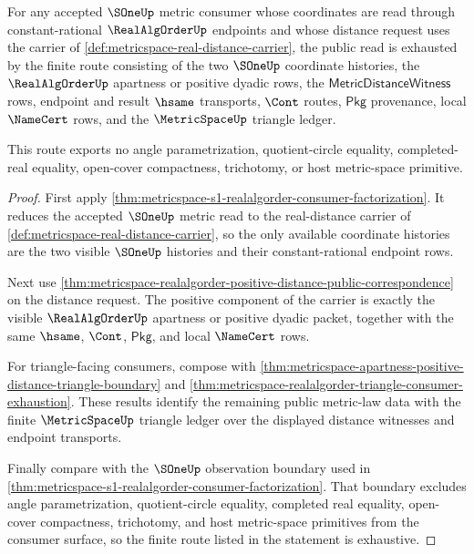 \begin{theorem}
\label{thm:metricspace-realalgorder-sone-distance-route-exhaustion}
For any accepted $\SOneUp$ metric consumer whose coordinates are read through
constant-rational $\RealAlgOrderUp$ endpoints and whose distance request uses
the carrier of \autoref{def:metricspace-real-distance-carrier}, the public
read is exhausted by the finite route consisting of the two $\SOneUp$
coordinate histories, the $\RealAlgOrderUp$ apartness or positive dyadic rows,
the $\mathsf{MetricDistanceWitness}$ rows, endpoint and result $\hsame$
transports, $\Cont$ routes, $\mathsf{Pkg}$ provenance, local $\NameCert$ rows,
and the $\MetricSpaceUp$ triangle ledger.

This route exports no angle parametrization, quotient-circle equality,
completed-real equality, open-cover compactness, trichotomy, or host
metric-space primitive.
\end{theorem}
\begin{proof}
First apply
\autoref{thm:metricspace-s1-realalgorder-consumer-factorization}. It reduces
the accepted $\SOneUp$ metric read to the real-distance carrier of
\autoref{def:metricspace-real-distance-carrier}, so the only available
coordinate histories are the two visible $\SOneUp$ histories and their
constant-rational endpoint rows.

Next use
\autoref{thm:metricspace-realalgorder-positive-distance-public-correspondence}
on the distance request. The positive component of the carrier is exactly the
visible $\RealAlgOrderUp$ apartness or positive dyadic packet, together with
the same $\hsame$, $\Cont$, $\mathsf{Pkg}$, and local $\NameCert$ rows.

For triangle-facing consumers, compose with
\autoref{thm:metricspace-apartness-positive-distance-triangle-boundary} and
\autoref{thm:metricspace-realalgorder-triangle-consumer-exhaustion}. These
results identify the remaining public metric-law data with the finite
$\MetricSpaceUp$ triangle ledger over the displayed distance witnesses and
endpoint transports.

Finally compare with the $\SOneUp$ observation boundary used in
\autoref{thm:metricspace-s1-realalgorder-consumer-factorization}. That
boundary excludes angle parametrization, quotient-circle equality, completed
real equality, open-cover compactness, trichotomy, and host metric-space
primitives from the consumer surface, so the finite route listed in the
statement is exhaustive.
\end{proof}

